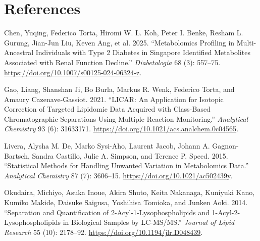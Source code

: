 \documentclass[
  letterpaper,
  DIV=11,
  numbers=noendperiod]{scrartcl}
\newlength{\cslhangindent}
\newenvironment{CSLReferences}[2] %
 {\begin{list}{}{%
  \setlength{\itemindent}{0pt}
  \setlength{\leftmargin}{0pt}
  \setlength{\parsep}{0pt}
  \ifodd #1
   \setlength{\leftmargin}{\cslhangindent}
   \setlength{\itemindent}{-1\cslhangindent}
  \fi
  \setlength{\itemsep}{#2\baselineskip}}}
 {\end{list}}
\begin{document}
\section*{References}\label{references}

\label{refs}
\begin{CSLReferences}{1}{0}
Chen, Yuqing, Federico Torta, Hiromi W. L. Koh, Peter I. Benke, Resham
L. Gurung, Jian-Jun Liu, Keven Ang, et al. 2025. {``Metabolomics
Profiling in Multi-Ancestral Individuals with Type 2 Diabetes in
Singapore Identified Metabolites Associated with Renal Function
Decline.''} \emph{Diabetologia} 68 (3): 557--75.
\url{https://doi.org/10.1007/s00125-024-06324-z}.

Gao, Liang, Shanshan Ji, Bo Burla, Markus R. Wenk, Federico Torta, and
Amaury Cazenave-Gassiot. 2021. {``LICAR: An Application for Isotopic
Correction of Targeted Lipidomic Data Acquired with Class-Based
Chromatographic Separations Using Multiple Reaction Monitoring.''}
\emph{Analytical Chemistry} 93 (6): 31633171.
\url{https://doi.org/10.1021/acs.analchem.0c04565}.

Livera, Alysha M. De, Marko Sysi-Aho, Laurent Jacob, Johann A.
Gagnon-Bartsch, Sandra Castillo, Julie A. Simpson, and Terence P. Speed.
2015. {``Statistical Methods for Handling Unwanted Variation in
Metabolomics Data.''} \emph{Analytical Chemistry} 87 (7): 3606--15.
\url{https://doi.org/10.1021/ac502439y}.

Okudaira, Michiyo, Asuka Inoue, Akira Shuto, Keita Nakanaga, Kuniyuki
Kano, Kumiko Makide, Daisuke Saigusa, Yoshihisa Tomioka, and Junken
Aoki. 2014. {``Separation and Quantification of
2-Acyl-1-Lysophospholipids and 1-Acyl-2-Lysophospholipids in Biological
Samples by LC-MS/MS.''} \emph{Journal of Lipid Research} 55 (10):
2178--92. \url{https://doi.org/10.1194/jlr.D048439}.

\end{CSLReferences}
\end{document}
